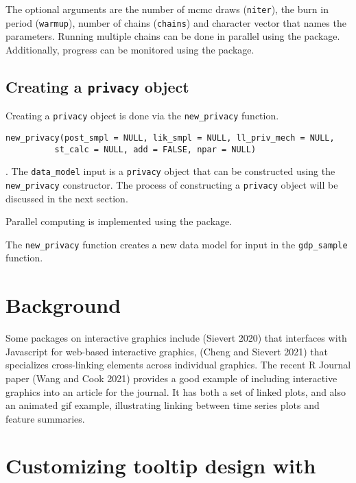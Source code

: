 The optional arguments are the number of mcmc draws (\texttt{niter}), the
burn in period (\texttt{warmup}), number of chains (\texttt{chains}) and character
vector that names the parameters. Running multiple chains can be done in parallel
using the  package. Additionally, progress can be monitored
using the  package.

\hypertarget{creating-a-privacy-object}{%
\subsection{\texorpdfstring{Creating a \texttt{privacy} object}{Creating a privacy object}}\label{creating-a-privacy-object}}

Creating a \texttt{privacy} object is done via the \texttt{new\_privacy} function.

\texttt{new\_privacy(post\_smpl\ =\ NULL,\ lik\_smpl\ =\ NULL,\ ll\_priv\_mech\ =\ NULL,\ \ \ \ \ \ \ \ \ \ \ \ \ st\_calc\ =\ NULL,\ add\ =\ FALSE,\ npar\ =\ NULL)}

. The \texttt{data\_model} input is a \texttt{privacy}
object that can be constructed using the \texttt{new\_privacy} constructor. The
process of constructing a \texttt{privacy} object will be discussed in the next section.

Parallel computing is implemented
using the  package.

The \texttt{new\_privacy} function creates a new data model for input in the
\texttt{gdp\_sample} function.

\hypertarget{background}{%
\section{Background}\label{background}}

Some packages on interactive graphics include  (Sievert 2020) that interfaces with Javascript for web-based interactive graphics,  (Cheng and Sievert 2021) that specializes cross-linking elements across individual graphics. The recent R Journal paper  (Wang and Cook 2021) provides a good example of including interactive graphics into an article for the journal. It has both a set of linked plots, and also an animated gif example, illustrating linking between time series plots and feature summaries.

\hypertarget{customizing-tooltip-design-with}{%
\section{\texorpdfstring{Customizing tooltip design with }{Customizing tooltip design with }}\label{customizing-tooltip-design-with}}

